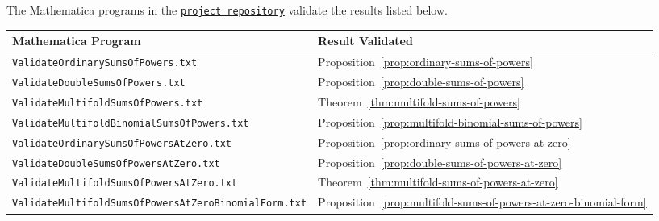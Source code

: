 The Mathematica programs in the
\href{https://github.com/kolosovpetro/SumsOfPowersViaCentralFiniteDifferencesAndNewtonFormula/tree/main/mathematica}
{\texttt{project repository}}
validate the results listed below.
\begin{center}
  \renewcommand{\arraystretch}{1.3}
  \begin{tabular}{ll}
    \toprule
    \textbf{Mathematica Program}  & \textbf{Result Validated} \\
    \midrule
    \texttt{ValidateOrdinarySumsOfPowers.txt}
    & Proposition~\eqref{prop:ordinary-sums-of-powers}
    \\
    \texttt{ValidateDoubleSumsOfPowers.txt}
    & Proposition~\eqref{prop:double-sums-of-powers}
    \\
    \texttt{ValidateMultifoldSumsOfPowers.txt}
    & Theorem~\eqref{thm:multifold-sums-of-powers}
    \\
    \texttt{ValidateMultifoldBinomialSumsOfPowers.txt}
    & Proposition~\eqref{prop:multifold-binomial-sums-of-powers}
    \\
    \texttt{ValidateOrdinarySumsOfPowersAtZero.txt}
    & Proposition~\eqref{prop:ordinary-sums-of-powers-at-zero}
    \\
    \texttt{ValidateDoubleSumsOfPowersAtZero.txt}
    & Proposition~\eqref{prop:double-sums-of-powers-at-zero}
    \\
    \texttt{ValidateMultifoldSumsOfPowersAtZero.txt}
    & Theorem~\eqref{thm:multifold-sums-of-powers-at-zero}
    \\
    \texttt{ValidateMultifoldSumsOfPowersAtZeroBinomialForm.txt}
    & Proposition~\eqref{prop:multifold-sums-of-powers-at-zero-binomial-form}
    \\
    \bottomrule
  \end{tabular}
\end{center}
